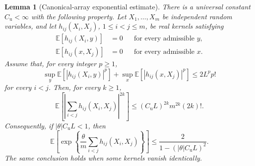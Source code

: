 \documentclass[11pt,reqno]{amsart}
\numberwithin{equation}{section}
\theoremstyle{plain}
\newtheorem{lemma}[lemma]{Lemma}
\theoremstyle{definition}
\newcommand{\E}{\mathbb E}
\begin{document}
\begin{lemma}[Canonical-array exponential estimate]
\label{lem:canonical-array-exponential}
There is a universal constant $C_{\mathrm u}<\infty$ with the following property.  Let $X_1,\ldots,X_m$ be independent random variables, and let $h_{ij}(X_i,X_j)$, $1\leq i<j\leq m$, be real kernels satisfying
\begin{align}
 \E[h_{ij}(X_i,y)]&=0
 &&\text{for every admissible }y,
 \label{eq:canonical-array-first}\\
 \E[h_{ij}(x,X_j)]&=0
 &&\text{for every admissible }x.
 \label{eq:canonical-array-second}
\end{align}
Assume that, for every integer $p\geq1$,
\begin{equation}
 \sup_y\E[|h_{ij}(X_i,y)|^p]
 +\sup_x\E[|h_{ij}(x,X_j)|^p]
 \leq2L^p p!
 \label{eq:canonical-array-kernel-moments}
\end{equation}
for every $i<j$.  Then, for every $k\geq1$,
\begin{equation}
 \E\left[\left|\sum_{i<j}h_{ij}(X_i,X_j)\right|^{2k}\right]
 \leq(C_{\mathrm u}L)^{2k}m^{2k}(2k)!.
 \label{eq:canonical-array-moment}
\end{equation}
Consequently, if $|\theta|C_{\mathrm u}L<1$, then
\begin{equation}
 \E\left[\exp\left\{\frac\theta m\sum_{i<j}h_{ij}(X_i,X_j)\right\}\right]
 \leq\frac{2}{1-(|\theta|C_{\mathrm u}L)^2}.
 \label{eq:canonical-array-exponential}
\end{equation}
The same conclusion holds when some kernels vanish identically.
\end{lemma}
\end{document}
